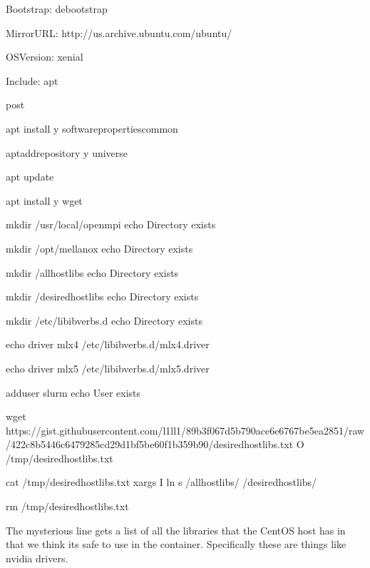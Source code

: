 \documentclass[letterpaper,10pt,english]{sphinxmanual}
\begin{document}
%
\begin{sphinxVerbatim}[commandchars=\\\{\}]
Bootstrap: debootstrap

MirrorURL: http://us.archive.ubuntu.com/ubuntu/

OSVersion: xenial

Include: apt



\PYGZpc{}post

apt install \PYGZhy{}y software\PYGZhy{}properties\PYGZhy{}common

apt\PYGZhy{}add\PYGZhy{}repository \PYGZhy{}y universe

apt update

apt install \PYGZhy{}y wget

mkdir /usr/local/openmpi \textbar{}\textbar{} echo \PYGZdq{}Directory exists\PYGZdq{}

mkdir /opt/mellanox \textbar{}\textbar{} echo \PYGZdq{}Directory exists\PYGZdq{}

mkdir /all\PYGZus{}hostlibs \textbar{}\textbar{} echo \PYGZdq{}Directory exists\PYGZdq{}

mkdir /desired\PYGZus{}hostlibs \textbar{}\textbar{} echo \PYGZdq{}Directory exists\PYGZdq{}

mkdir /etc/libibverbs.d \textbar{}\textbar{} echo \PYGZdq{}Directory exists\PYGZdq{}

echo \PYGZdq{}driver mlx4\PYGZdq{} \PYGZgt{} /etc/libibverbs.d/mlx4.driver

echo \PYGZdq{}driver mlx5\PYGZdq{} \PYGZgt{} /etc/libibverbs.d/mlx5.driver

adduser slurm \textbar{}\textbar{} echo \PYGZdq{}User exists\PYGZdq{}

wget https://gist.githubusercontent.com/l1ll1/89b3f067d5b790ace6e6767be5ea2851/raw/422c8b5446c6479285cd29d1bf5be60f1b359b90/desired\PYGZus{}hostlibs.txt \PYGZhy{}O /tmp/desired\PYGZus{}hostlibs.txt

cat /tmp/desired\PYGZus{}hostlibs.txt \textbar{} xargs \PYGZhy{}I\PYGZob{}\PYGZcb{} ln \PYGZhy{}s /all\PYGZus{}hostlibs/\PYGZob{}\PYGZcb{} /desired\PYGZus{}hostlibs/\PYGZob{}\PYGZcb{}

rm /tmp/desired\PYGZus{}hostlibs.txt
\end{sphinxVerbatim}

The mysterious  line gets a list of all the libraries that the CentOS host has in  that we
think its safe to use in the container. Specifically these are things like nvidia drivers.
\end{document}
